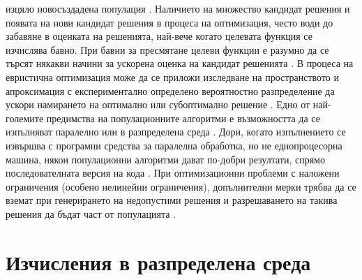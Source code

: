изцяло новосъздадена популация \cite{Wegener-01}. Наличието на множество кандидат решения и появата на нови кандидат решения в процеса на оптимизация, често води до забавяне в оценката на решенията, най-вече когато целевата функция се изчислява бавно. При бавни за пресмятане целеви функции \cite{Naudts-01} е разумно да се търсят някакви начини за ускорена оценка на кандидат решенията \cite{Salami-01}. В процеса на евристична оптимизация може да се приложи изследване на пространството и апроксимация с експериментално определено вероятностно разпределение да ускори намирането на оптимално или субоптимално решение \cite{Kern-01}. Едно от най-големите предимства на популационните алгоритми е възможността да се изпълняват паралелно или в разпределена среда \cite{Vikhar-01}. Дори, когато изпълнението се извършва с програмни средства за паралелна обработка, но не еднопроцесорна машина, някои популационни алгоритми дават по-добри резултати, спрямо последователната версия на кода \cite{Alba-01}. При оптимизационни проблеми с наложени ограничения (особено нелинейни ограничения), допълнителни мерки трябва да се вземат при генерирането на недопустими решения и разрешаването на такива решения да бъдат част от популацията \cite{Lagaros-01}.

\section{Изчисления в разпределена среда}

